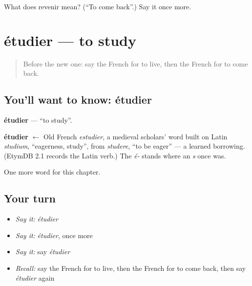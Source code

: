 \begin{tcolorbox}[breakable,colback=teal!4,colframe=teal!35!black,title={Before you move on}]
What does revenir mean? (\textquotedblleft{}To come back\textquotedblright{}.) Say it once more.
\end{tcolorbox}
\section[étudier]{étudier — to study}

\label{lesson:FR-C62-etudier}



\begin{quote}
Before the new one: say the French for to live, then the French for to come back.
\end{quote}

\subsection*{You'll want to know: étudier}
\textbf{étudier} — \textquotedblleft{}to study\textquotedblright{}.

\begin{cousinweb}
\textbf{étudier} $\leftarrow$ Old French \emph{estudier}, a medieval scholars' word built on Latin \emph{studium}, \textquotedblleft{}eagerness, study\textquotedblright{}, from \emph{studere}, \textquotedblleft{}to be eager\textquotedblright{} — a learned borrowing. (EtymDB 2.1 records the Latin verb.) The \emph{é-} stands where an \emph{s} once was.
\end{cousinweb}

\begin{grammarlens}[title={What you've built}]
One more word for this chapter.
\end{grammarlens}

\subsection*{Your turn}
\begin{itemize}
\raggedright
  \item \emph{Say it:} \emph{étudier}
  \item \emph{Say it:} \emph{étudier}, once more
  \item \emph{Say it:} say \emph{étudier}
  \item \emph{Recall:} say the French for to live, then the French for to come back, then say \emph{étudier} again
\end{itemize}

